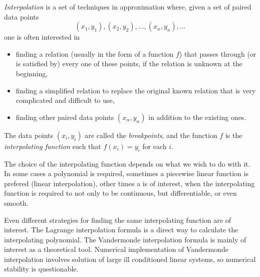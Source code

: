 \documentclass[12pt]{article}
\begin{document}
\emph{Interpolation} is a set of techniques in approximation where, given a set of paired data points
$$(x_1,y_1),(x_2,y_2),\ldots, (x_n,y_n),\ldots$$ one is often interested in 
\begin{itemize}
\item finding a relation (usually in the form of a function $f$) that passes through (or is satisfied by) every one of these points, if the relation is unknown at the beginning,
\item finding a simplified relation to replace the original known relation that is very complicated and difficult to use,
\item finding other paired data points $(x_{\alpha},y_{\alpha})$ in addition to the existing ones.
\end{itemize}
The data points $(x_i,y_i)$ are called the \emph{breakpoints}, and the function $f$ is the \emph{interpolating function} such that $f(x_i)=y_i$ for each $i$.

The choice of the interpolating function depends on what we wish to do with it. In some cases a polynomial is required, sometimes a piecewise linear  function is prefered (linear interpolation), other times a  is of interest, when the interpolating function is required to not only to be continuous, but differentiable, or even smooth.

Even different strategies for finding the same interpolating function are of interest. The Lagrange interpolation formula is a direct way to calculate the interpolating polynomial. The Vandermonde interpolation formula is mainly of interest as a theoretical tool. Numerical implementation of Vandermonde interpolation involves solution of large ill conditioned linear systems, so numerical stability is questionable.
\end{document}
